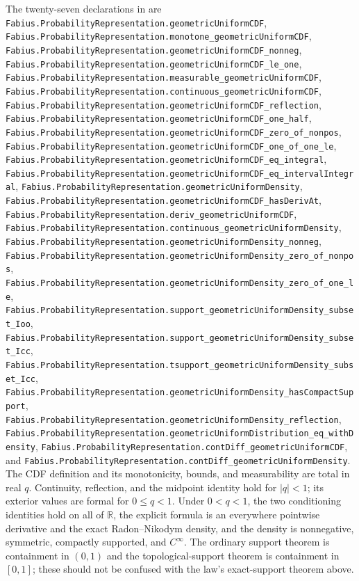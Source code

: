 \documentclass[11pt,oneside]{article}
\theoremstyle{definition}
\theoremstyle{remark}
\newcommand{\R}{\mathbb R}
\newcommand{\1}{\mathbf 1}
\begin{document}
\begin{statusbox}
The twenty-seven declarations in  are
\nolinkurl{Fabius.ProbabilityRepresentation.geometricUniformCDF},
\nolinkurl{Fabius.ProbabilityRepresentation.monotone_geometricUniformCDF},
\nolinkurl{Fabius.ProbabilityRepresentation.geometricUniformCDF_nonneg},
\nolinkurl{Fabius.ProbabilityRepresentation.geometricUniformCDF_le_one},
\nolinkurl{Fabius.ProbabilityRepresentation.measurable_geometricUniformCDF},
\nolinkurl{Fabius.ProbabilityRepresentation.continuous_geometricUniformCDF},
\nolinkurl{Fabius.ProbabilityRepresentation.geometricUniformCDF_reflection},
\nolinkurl{Fabius.ProbabilityRepresentation.geometricUniformCDF_one_half},
\nolinkurl{Fabius.ProbabilityRepresentation.geometricUniformCDF_zero_of_nonpos},
\nolinkurl{Fabius.ProbabilityRepresentation.geometricUniformCDF_one_of_one_le},
\nolinkurl{Fabius.ProbabilityRepresentation.geometricUniformCDF_eq_integral},
\nolinkurl{Fabius.ProbabilityRepresentation.geometricUniformCDF_eq_intervalIntegral},
\nolinkurl{Fabius.ProbabilityRepresentation.geometricUniformDensity},
\nolinkurl{Fabius.ProbabilityRepresentation.geometricUniformCDF_hasDerivAt},
\nolinkurl{Fabius.ProbabilityRepresentation.deriv_geometricUniformCDF},
\nolinkurl{Fabius.ProbabilityRepresentation.continuous_geometricUniformDensity},
\nolinkurl{Fabius.ProbabilityRepresentation.geometricUniformDensity_nonneg},
\nolinkurl{Fabius.ProbabilityRepresentation.geometricUniformDensity_zero_of_nonpos},
\nolinkurl{Fabius.ProbabilityRepresentation.geometricUniformDensity_zero_of_one_le},
\nolinkurl{Fabius.ProbabilityRepresentation.support_geometricUniformDensity_subset_Ioo},
\nolinkurl{Fabius.ProbabilityRepresentation.support_geometricUniformDensity_subset_Icc},
\nolinkurl{Fabius.ProbabilityRepresentation.tsupport_geometricUniformDensity_subset_Icc},
\nolinkurl{Fabius.ProbabilityRepresentation.geometricUniformDensity_hasCompactSupport},
\nolinkurl{Fabius.ProbabilityRepresentation.geometricUniformDensity_reflection},
\nolinkurl{Fabius.ProbabilityRepresentation.geometricUniformDistribution_eq_withDensity},
\nolinkurl{Fabius.ProbabilityRepresentation.contDiff_geometricUniformCDF}, and
\nolinkurl{Fabius.ProbabilityRepresentation.contDiff_geometricUniformDensity}.
The CDF definition and its monotonicity, bounds, and measurability are total in real \(q\).
Continuity, reflection, and the midpoint identity hold for \(|q|<1\); its exterior values
are formal for \(0\le q<1\).  Under \(0<q<1\), the two conditioning identities hold on
all of \(\R\), the explicit formula is an everywhere pointwise derivative and the exact
Radon--Nikodym density, and the density is nonnegative, symmetric, compactly supported,
and \(C^\infty\).  The ordinary support theorem is containment in \((0,1)\) and the
topological-support theorem is containment in \([0,1]\); these should not be confused with
the law's exact-support theorem above.


\end{statusbox}
\end{document}
